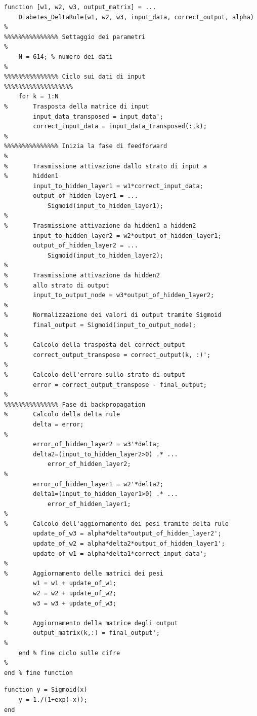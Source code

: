 \documentclass[a4paper,12pt]{article}
\begin{document}
\newpage
\begin{lstlisting}[style=Matlab-editor,title=\texttt{Diabetes\_DeltaRule.m},label=lst:deltarule]
function [w1, w2, w3, output_matrix] = ...
    Diabetes_DeltaRule(w1, w2, w3, input_data, correct_output, alpha)
%
%%%%%%%%%%%%%%% Settaggio dei parametri
%
    N = 614; % numero dei dati
%
%%%%%%%%%%%%%%% Ciclo sui dati di input
%%%%%%%%%%%%%%%%%%%
    for k = 1:N
%       Trasposta della matrice di input
        input_data_transposed = input_data';
        correct_input_data = input_data_transposed(:,k);
%
%%%%%%%%%%%%%%% Inizia la fase di feedforward
%
%       Trasmissione attivazione dallo strato di input a
%       hidden1
        input_to_hidden_layer1 = w1*correct_input_data;
        output_of_hidden_layer1 = ... 
            Sigmoid(input_to_hidden_layer1);
%
%       Trasmissione attivazione da hidden1 a hidden2
        input_to_hidden_layer2 = w2*output_of_hidden_layer1;
        output_of_hidden_layer2 = ... 
            Sigmoid(input_to_hidden_layer2);
%
%       Trasmissione attivazione da hidden2
%       allo strato di output
        input_to_output_node = w3*output_of_hidden_layer2;
%
%       Normalizzazione dei valori di output tramite Sigmoid
        final_output = Sigmoid(input_to_output_node);
%
%       Calcolo della trasposta del correct_output
        correct_output_transpose = correct_output(k, :)';
%
%       Calcolo dell'errore sullo strato di output
        error = correct_output_transpose - final_output;
%
%%%%%%%%%%%%%%% Fase di backpropagation
%       Calcolo della delta rule
        delta = error;
%
        error_of_hidden_layer2 = w3'*delta;
        delta2=(input_to_hidden_layer2>0) .* ... 
            error_of_hidden_layer2;
%
        error_of_hidden_layer1 = w2'*delta2;
        delta1=(input_to_hidden_layer1>0) .* ... 
            error_of_hidden_layer1;
%
%       Calcolo dell'aggiornamento dei pesi tramite delta rule
        update_of_w3 = alpha*delta*output_of_hidden_layer2';
        update_of_w2 = alpha*delta2*output_of_hidden_layer1';
        update_of_w1 = alpha*delta1*correct_input_data';
%
%       Aggiornamento delle matrici dei pesi
        w1 = w1 + update_of_w1;
        w2 = w2 + update_of_w2;
        w3 = w3 + update_of_w3;
%
%       Aggiornamento della matrice degli output
        output_matrix(k,:) = final_output';
%
    end % fine ciclo sulle cifre
%
end % fine function
\end{lstlisting}



\vfill
\begin{lstlisting}[style=Matlab-editor,title=\texttt{Sigmoid.m},label=lst:sigmoid]
function y = Sigmoid(x)
    y = 1./(1+exp(-x));
end
\end{lstlisting}
\end{document}
